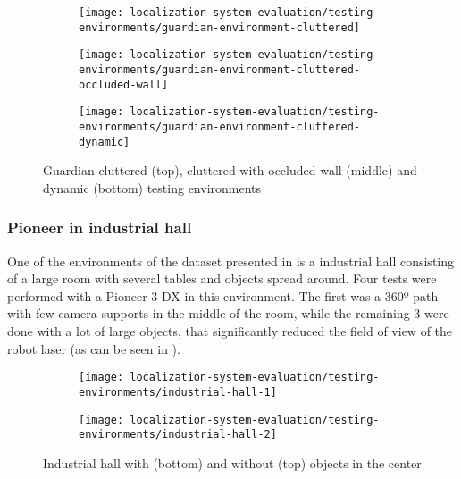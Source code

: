 \begin{figure}[H]
	\centering
	\begin{subfigure}[ht]{0.45\textwidth}
		\centering
		\texttt{[image: localization-system-evaluation/testing-environments/guardian-environment-cluttered]}
	\end{subfigure}
	\begin{subfigure}[ht]{0.45\textwidth}
		\centering
		\texttt{[image: localization-system-evaluation/testing-environments/guardian-environment-cluttered-occluded-wall]}
	\end{subfigure}
	\begin{subfigure}[ht]{0.45\textwidth}
		\centering
		\texttt{[image: localization-system-evaluation/testing-environments/guardian-environment-cluttered-dynamic]}
	\end{subfigure}
	\caption{Guardian cluttered (top), cluttered with occluded wall (middle) and dynamic (bottom) testing environments}
	\label{fig:localization-system-evaluation_guardian-tests-environment-cluttered}
\end{figure}



\subsubsection{Pioneer in industrial hall}

One of the environments of the dataset presented in \cite{Sturm2012} is a industrial hall consisting of a large room with several tables and objects spread around. Four tests were performed with a Pioneer 3-DX in this environment. The first was a 360º path with few camera supports in the middle of the room, while the remaining 3 were done with a lot of large objects, that significantly reduced the field of view of the robot laser (as can be seen in ).

\begin{figure}[H]
	\centering
	\begin{subfigure}[ht]{0.37\textwidth}
		\centering
		\texttt{[image: localization-system-evaluation/testing-environments/industrial-hall-1]}
	\end{subfigure}
	\begin{subfigure}[ht]{0.37\textwidth}
		\centering
		\texttt{[image: localization-system-evaluation/testing-environments/industrial-hall-2]}
	\end{subfigure}
	\caption{Industrial hall with (bottom) and without (top) objects in the center \cite{Sturm2012}}
	\label{fig:localization-system-evaluation_industrial-hall}
\end{figure}



